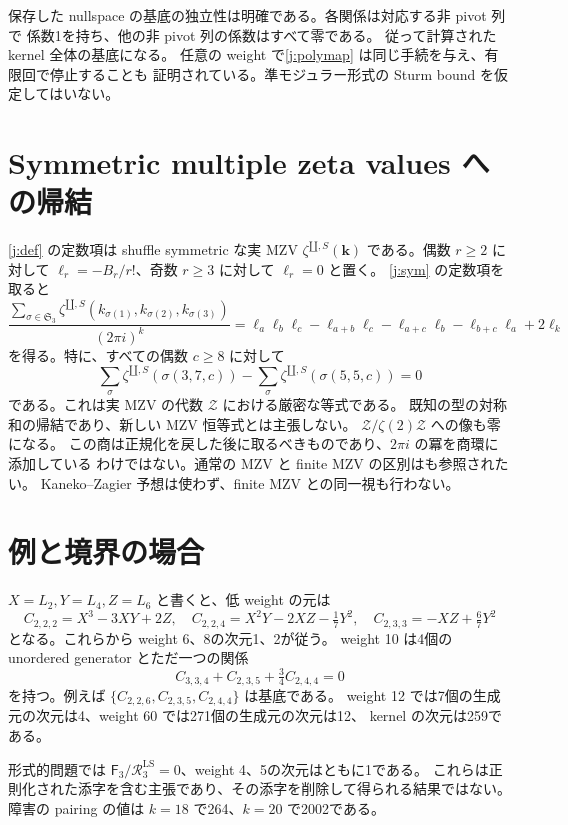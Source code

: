 \documentclass[12pt]{amsart}
\theoremstyle{definition}
\theoremstyle{remark}
\numberwithin{equation}{section}
\newcommand{\sh}{\mathbin{\amalg}}
\newcommand{\RR}{\mathcal R^{\mathrm{LS}}}
\newcommand{\FF}{\mathsf F}
\numberwithin{equation}{section}
\begin{document}
保存した nullspace の基底の独立性は明確である。各関係は対応する非 pivot 列で
係数1を持ち、他の非 pivot 列の係数はすべて零である。
従って計算された kernel 全体の基底になる。
任意の weight で\eqref{j:polymap} は同じ手続を与え、有限回で停止することも
証明されている。準モジュラー形式の Sturm bound を仮定してはいない。

\section{Symmetric multiple zeta values への帰結}
\eqref{j:def} の定数項は shuffle symmetric な実 MZV
$\zeta^{\sh,S}(\boldsymbol k)$ である。偶数 $r\ge2$ に対して
$\ell_r=-B_r/r!$、奇数 $r\ge3$ に対して $\ell_r=0$ と置く。
\eqref{j:sym} の定数項を取ると
\begin{equation}\label{j:constant}
 \frac{\sum_{\sigma\in\mathfrak S_3}
        \zeta^{\sh,S}(k_{\sigma(1)},k_{\sigma(2)},k_{\sigma(3)})}{(2\pi i)^k}
 =\ell_a\ell_b\ell_c-\ell_{a+b}\ell_c-\ell_{a+c}\ell_b-\ell_{b+c}\ell_a+2\ell_k
\end{equation}
を得る。特に、すべての偶数 $c\ge8$ に対して
\[
 \sum_{\sigma}\zeta^{\sh,S}(\sigma(3,7,c))
 -\sum_{\sigma}\zeta^{\sh,S}(\sigma(5,5,c))=0
\]
である。これは実 MZV の代数 $\mathcal Z$ における厳密な等式である。
既知の型の対称和の帰結であり、新しい MZV 恒等式とは主張しない。
$\mathcal Z/\zeta(2)\mathcal Z$ への像も零になる。
この商は正規化を戻した後に取るべきものであり、$2\pi i$ の冪を商環に添加している
わけではない。通常の MZV と finite MZV の区別は\cite{j-kaneko}も参照されたい。
Kaneko--Zagier 予想は使わず、finite MZV との同一視も行わない。

\section{例と境界の場合}
$X=L_2,Y=L_4,Z=L_6$ と書くと、低 weight の元は
\[
 C_{2,2,2}=X^3-3XY+2Z,\quad
 C_{2,2,4}=X^2Y-2XZ-\tfrac17Y^2,\quad
 C_{2,3,3}=-XZ+\tfrac67Y^2
\]
となる。これらから weight 6、8の次元1、2が従う。
weight 10 は4個の unordered generator とただ一つの関係
\[
 C_{3,3,4}+C_{2,3,5}+\tfrac34 C_{2,4,4}=0
\]
を持つ。例えば $\{C_{2,2,6},C_{2,3,5},C_{2,4,4}\}$ は基底である。
weight 12 では7個の生成元の次元は4、weight 60 では271個の生成元の次元は12、
kernel の次元は259である。

形式的問題では $\FF_3/\RR_3=0$、weight 4、5の次元はともに1である。
これらは正則化された添字を含む主張であり、その添字を削除して得られる結果ではない。
障害の pairing の値は $k=18$ で264、$k=20$ で2002である。
\end{document}
